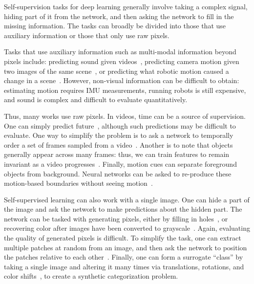 \documentclass[10pt,twocolumn,letterpaper]{article}
\begin{document}
Self-supervision tasks for deep learning 
generally involve taking a complex signal, hiding part of it from the network, and then asking the network to fill in the missing information.
The tasks can broadly be divided into those that use auxiliary information or those that only use raw pixels.

Tasks that use auxiliary information such as  multi-modal information beyond
pixels include:  predicting sound given
videos~\cite{owens2016ambient}, predicting camera motion given two
images of the same
scene~\cite{jayaraman2015learning,agrawal2015learning,zamir2016generic},
or predicting what robotic motion caused a change in a
scene~\cite{pinto2016curious,pinto2016supersizing,pinto2016supervision,agrawal2016learning,pinto2016learning}.
However, non-visual information can be difficult to obtain: estimating
motion requires IMU measurements, running robots is still expensive,
and sound is complex and difficult to evaluate
quantitatively.

Thus, many works use raw pixels.  
In videos, time can be a source of supervision.
One can simply predict future~\cite{walker2016uncertain,walker2015dense}, although such predictions may be difficult to evaluate.
One way to simplify the problem is to ask a network to temporally order a set of frames sampled from a video~\cite{misra2016shuffle}.
Another is to note that objects generally appear across many frames: thus, we can train features to remain invariant as a video progresses~\cite{foldiak1991learning,wiskott2002slow,mobahi2009deep,wang2015unsupervised,zou2012deep}. 
Finally, motion cues can separate foreground objects from background.
Neural networks can be asked to re-produce these motion-based boundaries without seeing motion~\cite{pathak2016learning,li2016unsupervised}.

Self-supervised learning can also work with a single image.  
One can hide a part of the image and ask the network to make predictions about the hidden part.
The network can be tasked with generating pixels, either by filling in holes~\cite{pathak2016context,denton2016semi}, or recovering color after images have been converted to grayscale~\cite{zhang2016colorful,larsson2016learning}.
Again, evaluating the quality of generated pixels is difficult.
To simplify the task, one can extract multiple patches at random from an image, and then ask the network to position the patches relative to each other~\cite{doersch2015unsupervised,noroozi2016unsupervised}.
Finally, one can form a surrogate ``class'' by taking a single image and altering it many times via translations, rotations, and color shifts~\cite{dosovitskiy2014discriminative}, to create a synthetic categorization problem.
\end{document}
